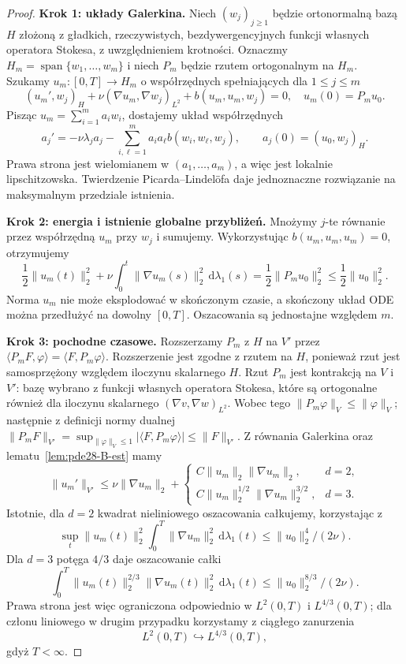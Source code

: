 \begin{proof}
\textbf{Krok 1: układy Galerkina.}
Niech $(w_j)_{j\ge1}$ będzie ortonormalną bazą $H$
złożoną z gładkich, rzeczywistych, bezdywergencyjnych
funkcji własnych operatora Stokesa, z uwzględnieniem krotności.
Oznaczmy $H_m=\operatorname{span}\{w_1,\dots,w_m\}$
i niech $P_m$ będzie rzutem ortogonalnym na $H_m$.
Szukamy $u_m:[0,T]\to H_m$ o współrzędnych
spełniających dla $1\le j\le m$
\begin{equation}\label{eq:pde28-galerkin}
 (u_m',w_j)_H+\nu(\nabla u_m,\nabla w_j)_{L^2}
 +b(u_m,u_m,w_j)=0,\quad u_m(0)=P_m u_0.
\end{equation}
Pisząc $u_m=\sum_{i=1}^m a_iw_i$, dostajemy
układ współrzędnych
\[
 a_j'=-\nu\lambda_j a_j-
 \sum_{i,\ell=1}^m a_i a_\ell b(w_i,w_\ell,w_j),
 \qquad a_j(0)=(u_0,w_j)_H.
\]
Prawa strona jest wielomianem w $(a_1,\ldots,a_m)$,
a więc jest lokalnie lipschitzowska. Twierdzenie
Picarda--Lindelöfa daje jednoznaczne rozwiązanie
na maksymalnym przedziale istnienia.

\textbf{Krok 2: energia i istnienie globalne przybliżeń.}
Mnożymy $j$-te równanie przez współrzędną $u_m$ przy $w_j$
i sumujemy. Wykorzystując $b(u_m,u_m,u_m)=0$, otrzymujemy
\begin{equation}\label{eq:pde28-gal-energy}
 \frac12\|u_m(t)\|_2^2+\nu\int_0^t\|\nabla u_m(s)\|_2^2
 \,\mathrm d\lambda_1(s)=\frac12\|P_m u_0\|_2^2\le\frac12\|u_0\|_2^2.
\end{equation}
Norma $u_m$ nie może eksplodować w skończonym czasie,
a skończony układ ODE można przedłużyć na dowolny $[0,T]$.
Oszacowania są jednostajne względem $m$.

\textbf{Krok 3: pochodne czasowe.}
Rozszerzamy $P_m$ z $H$ na $V'$ przez
$\langle P_mF,\varphi\rangle=\langle F,P_m\varphi\rangle$.
Rozszerzenie jest zgodne z rzutem na $H$, ponieważ
rzut jest samosprzężony względem iloczynu skalarnego $H$.
Rzut $P_m$ jest kontrakcją na $V$ i $V'$:
bazę wybrano z funkcji własnych operatora Stokesa,
które są ortogonalne również dla iloczynu skalarnego
$(\nabla v,\nabla w)_{L^2}$. Wobec tego
$\|P_m\varphi\|_V\le\|\varphi\|_V$;
następnie z definicji normy dualnej
$\|P_m F\|_{V'}=\sup_{\|\varphi\|_V\le1}
|\langle F,P_m\varphi\rangle|\le\|F\|_{V'}$.
Z równania Galerkina oraz lematu~\ref{lem:pde28-B-est} mamy
\[
 \|u_m'\|_{V'}\le\nu\|\nabla u_m\|_2+
 \begin{cases}
 C\|u_m\|_2\|\nabla u_m\|_2,&d=2,\\
 C\|u_m\|_2^{1/2}\|\nabla u_m\|_2^{3/2},&d=3.
 \end{cases}
\]
Istotnie, dla $d=2$ kwadrat nieliniowego
oszacowania całkujemy, korzystając z
\[
 \sup_t\|u_m(t)\|_2^2\int_0^T\|\nabla u_m\|_2^2
 \,\mathrm d\lambda_1(t)\le\|u_0\|_2^4/(2\nu).
\]
Dla $d=3$ potęga $4/3$ daje oszacowanie całki
\[
 \int_0^T\|u_m(t)\|_2^{2/3}\|\nabla u_m(t)\|_2^2
 \,\mathrm d\lambda_1(t)\le\|u_0\|_2^{8/3}/(2\nu).
\]
Prawa strona jest więc ograniczona odpowiednio
w $L^2(0,T)$ i $L^{4/3}(0,T)$; dla członu
liniowego w drugim przypadku korzystamy
z ciągłego zanurzenia
\[
 L^2(0,T)\hookrightarrow L^{4/3}(0,T),
\]
gdyż $T<\infty$.


\end{proof}
